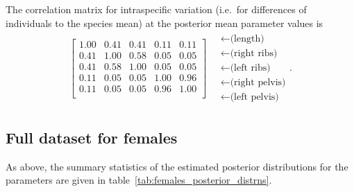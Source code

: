 \documentclass[12pt]{article}
\begin{document}
The correlation matrix for intraspecific variation 
(i.e.\ for differences of individuals to the species mean)
at the posterior mean parameter values is
\begin{align}
\begin{bmatrix}
   1.00 & 0.41 & 0.41 & 0.11 & 0.11 \\ 
   0.41 & 1.00 & 0.58 & 0.05 & 0.05 \\ 
   0.41 & 0.58 & 1.00 & 0.05 & 0.05 \\ 
   0.11 & 0.05 & 0.05 & 1.00 & 0.96 \\ 
   0.11 & 0.05 & 0.05 & 0.96 & 1.00 \\ 
 \end{bmatrix}
\quad \begin{matrix}
  \leftarrow \text{(length)} \\
  \leftarrow \text{(right ribs)} \\
  \leftarrow \text{(left ribs)} \\
  \leftarrow \text{(right pelvis)} \\
  \leftarrow \text{(left pelvis)} 
\end{matrix}  .
\end{align}


\subsection*{Full dataset for females}

As above, the summary statistics of the estimated posterior distributions 
for the parameters
are given in table~\ref{tab:females_posterior_distrns}.
\end{document}
